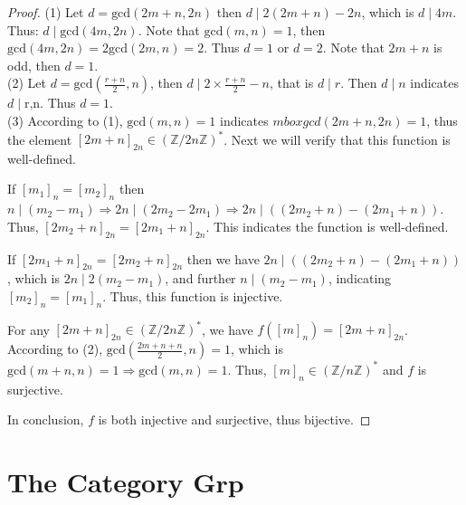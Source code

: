 \documentclass[a4paper, pdf, 12pt]{article}
\begin{document}
\begin{proof}
  \noindent (1) Let $d = \mbox{gcd}(2m+n,2n)$ then $d \mid 2(2m+n) - 2n$, which is $d \mid 4m$. Thus:
  $d \mid \mbox{gcd}(4m, 2n)$. Note that $\mbox{gcd}(m,n)=1$, then $\mbox{gcd}(4m,2n) = 2\mbox{gcd}(2m,n)=2$.
  Thus $d=1$ or $d=2$. Note that $2m+n$ is odd, then $d = 1$.\\

  \noindent (2) Let $d = \mbox{gcd}(\frac{r+n}{2},n)$, then $d \mid 2\times \frac{r+n}{2} - n$, that is $d\mid r$. Then $d\mid n$ indicates
  $d\mid \mbox{r,n}$. Thus $d=1$.\\

  \noindent (3)
  According to (1), $\mbox{gcd}(m,n)=1$ indicates $mbox{gcd}(2m+n, 2n)=1$, thus the element $[2m+n]_{2n}\in (\mathbb{Z}/2n\mathbb{Z})^{*}$.
  Next we will verify that this function is well-defined.

  If $[m_1]_{n} = [m_2]_{n}$ then $n\mid (m_2-m_1)\Rightarrow 2n\mid (2m_2-2m_1)\Rightarrow 2n\mid ((2m_2+n)-(2m_1+n))$.
  Thus, $[2m_2+n]_{2n} = [2m_1+n]_{2n}$. This indicates the function is well-defined.

  If $[2m_1+n]_{2n} = [2m_2+n]_{2n}$ then we have $2n\mid ((2m_2+n)-(2m_1+n))$, which is
  $2n\mid 2(m_2-m_1)$, and further $n\mid (m_2-m_1)$, indicating $[m_2]_{n} = [m_1]_{n}$. Thus, this function
  is injective.

  For any $[2m+n]_{2n}\in (\mathbb{Z}/2n\mathbb{Z})^{*}$, we have $f([m]_{n})=[2m+n]_{2n}$. According to (2),
  $\mbox{gcd}(\frac{2m+n+n}{2}, n) = 1$, which is $\mbox{gcd}(m+n,n)=1\Rightarrow\mbox{gcd}(m,n)=1$. Thus, $[m]_{n}\in (\mathbb{Z}/n\mathbb{Z})^{*}$ and
  $f$ is surjective.

  In conclusion, $f$ is both injective and surjective, thus bijective.

\end{proof}

\section*{The Category $\textbf{Grp}$}
\end{document}

